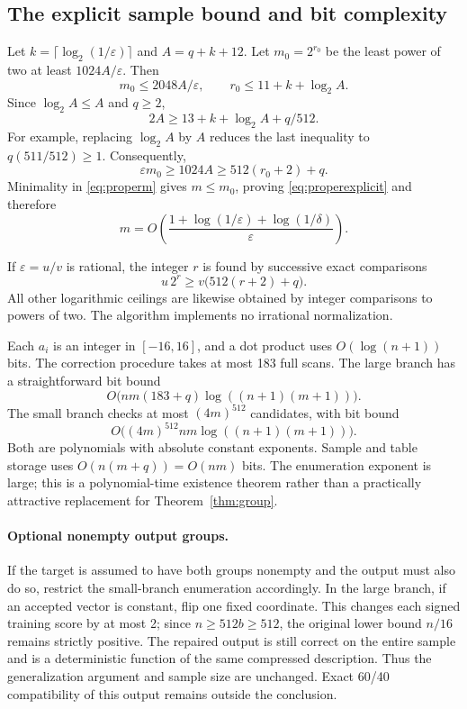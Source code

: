 \documentclass[11pt,a4paper]{article}
\theoremstyle{remark}
\newcommand{\1}{\mathbf 1}
\begin{document}
\subsection{The explicit sample bound and bit complexity}

Let $k=\lceil\log_2(1/\varepsilon)\rceil$ and $A=q+k+12$. Let $m_0=2^{r_0}$
be the least power of two at least $1024A/\varepsilon$. Then
\[
 m_0\le2048A/\varepsilon,\qquad
 r_0\le11+k+\log_2 A.
\]
Since $\log_2 A\le A$ and $q\ge2$,
\[
 2A\ge13+k+\log_2 A+q/512.
\]
For example, replacing $\log_2 A$ by $A$ reduces the last inequality to
$q(511/512)\ge1$. Consequently,
\[
 \varepsilon m_0\ge1024A\ge512(r_0+2)+q.
\]
Minimality in \eqref{eq:properm} gives $m\le m_0$, proving
\eqref{eq:properexplicit} and therefore
\[
 m=O\!\left(
 \frac{1+\log(1/\varepsilon)+\log(1/\delta)}{\varepsilon}
 \right).
\]

If $\varepsilon=u/v$ is rational, the integer $r$ is found by successive exact
comparisons
\[
 u\,2^r\ge v\big(512(r+2)+q\big).
\]
All other logarithmic ceilings are likewise obtained by integer comparisons
to powers of two. The algorithm implements no irrational normalization.

Each $a_i$ is an integer in $[-16,16]$, and a dot product uses
$O(\log(n+1))$ bits. The correction procedure takes at most 183 full scans.
The large branch has a straightforward bit bound
\[
 O\big(nm(183+q)\log((n+1)(m+1))\big).
\]
The small branch checks at most $(4m)^{512}$ candidates, with bit bound
\[
 O\big((4m)^{512}nm\log((n+1)(m+1))\big).
\]
Both are polynomials with absolute constant exponents. Sample and table
storage uses $O(n(m+q))=O(nm)$ bits. The enumeration exponent is large;
this is a polynomial-time existence theorem rather than a practically
attractive replacement for Theorem~\ref{thm:group}.

\paragraph{Optional nonempty output groups.}
If the target is assumed to have both groups nonempty and the output must
also do so, restrict the small-branch enumeration accordingly. In the large
branch, if an accepted vector is constant, flip one fixed coordinate.
This changes each signed training score by at most 2; since
$n\ge512b\ge512$, the original lower bound $n/16$ remains strictly positive.
The repaired output is still correct on the entire sample and is a
deterministic function of the same compressed description. Thus the
generalization argument and sample size are unchanged. Exact 60/40
compatibility of this output remains outside the conclusion.
\end{document}
